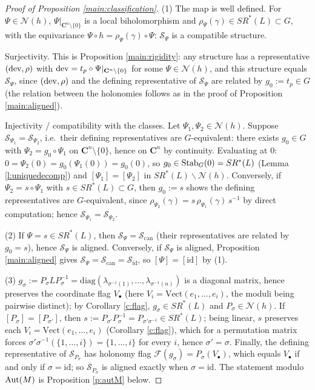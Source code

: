 \documentclass[english,11pt]{amsart}
\theoremstyle{definition}
\theoremstyle{remark}
\numberwithin{equation}{section}
\newcommand{\C}{\mathbf{C}}
\newcommand{\FF}{\mathcal{F}}
\newcommand{\Aut}{\mathop{\rm Aut}}
\newcommand{\Stab}{\mathop{\rm Stab}}
\newcommand{\dev}{\mathop{\rm dev}\nolimits}
\newcommand{\Norm}{\mathcal{N}}
\newcommand{\Sc}{\mathcal{S}}
\begin{document}
\begin{proof}[Proof of Proposition \ref{main:classification}]
(1) The map is well defined. For $\Psi\in\Norm(h)$, $\Psi|_{\C^n\setminus\{0\}}$ is a local biholomorphism and $\rho_\Psi(\gamma)\in SR^*(L)\subset G$, with the equivariance $\Psi\circ h=\rho_\Psi(\gamma)\circ\Psi$: $\Sc_\Psi$ is a compatible structure.

Surjectivity. This is Proposition \ref{main:rigidity}: any structure has a representative $(\dev,\rho)$ with $\dev=t_p\circ\Psi|_{\C^n\setminus\{0\}}$ for some $\Psi\in\Norm(h)$, and this structure equals $\Sc_\Psi$, since $(\dev,\rho)$ and the defining representative of $\Sc_\Psi$ are related by $g_0:=t_p\in G$ (the relation between the holonomies follows as in the proof of Proposition \ref{main:aligned}).

Injectivity / compatibility with the classes. Let $\Psi_1,\Psi_2\in\Norm(h)$. Suppose $\Sc_{\Psi_1}=\Sc_{\Psi_2}$, i.e.\ their defining representatives are $G$-equivalent: there exists $g_0\in G$ with $\Psi_2=g_0\circ\Psi_1$ on $\C^n\setminus\{0\}$, hence on $\C^n$ by continuity. Evaluating at $0$: $0=\Psi_2(0)=g_0(\Psi_1(0))=g_0(0)$, so $g_0\in\Stab_G(0)=SR^*(L)$ (Lemma \ref{l:uniquedecomp}) and $[\Psi_1]=[\Psi_2]$ in $SR^*(L)\backslash\Norm(h)$. Conversely, if $\Psi_2=s\circ\Psi_1$ with $s\in SR^*(L)\subset G$, then $g_0:=s$ shows the defining representatives are $G$-equivalent, since $\rho_{\Psi_2}(\gamma)=s\,\rho_{\Psi_1}(\gamma)\,s^{-1}$ by direct computation; hence $\Sc_{\Psi_1}=\Sc_{\Psi_2}$.

(2) If $\Psi=s\in SR^*(L)$, then $\Sc_\Psi=\Sc_{\mathrm{can}}$ (their representatives are related by $g_0=s$), hence $\Sc_\Psi$ is aligned. Conversely, if $\Sc_\Psi$ is aligned, Proposition \ref{main:aligned} gives $\Sc_\Psi=\Sc_{\mathrm{can}}=\Sc_{\mathrm{id}}$, so $[\Psi]=[\mathrm{id}]$ by (1).

(3) $g_\sigma:=P_\sigma L P_\sigma^{-1}=\mathrm{diag}(\lambda_{\sigma^{-1}(1)},\dots,\lambda_{\sigma^{-1}(n)})$ is a diagonal matrix, hence preserves the coordinate flag $V_\bullet$ (here $V_i=\mathrm{Vect}(e_1,\dots,e_i)$, the moduli being pairwise distinct); by Corollary \ref{c:flag}, $g_\sigma\in SR^*(L)$ and $P_\sigma\in\Norm(h)$. If $[P_\sigma]=[P_{\sigma'}]$, then $s:=P_{\sigma'}P_\sigma^{-1}=P_{\sigma'\sigma^{-1}}\in SR^*(L)$; being linear, $s$ preserves each $V_i=\mathrm{Vect}(e_1,\dots,e_i)$ (Corollary \ref{c:flag}), which for a permutation matrix forces $\sigma'\sigma^{-1}(\{1,\dots,i\})=\{1,\dots,i\}$ for every $i$, hence $\sigma'=\sigma$. Finally, the defining representative of $\Sc_{P_\sigma}$ has holonomy flag $\FF(g_\sigma)=P_\sigma(V_\bullet)$, which equals $V_\bullet$ if and only if $\sigma=\mathrm{id}$; so $\Sc_{P_\sigma}$ is aligned exactly when $\sigma=\mathrm{id}$. The statement modulo $\Aut(M)$ is Proposition \ref{p:autM} below.
\end{proof}
\end{document}
